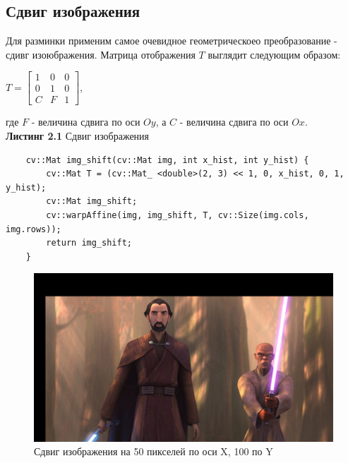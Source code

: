     \subsection{Сдвиг изображения}
    \noindent Для разминки применим самое очевидное геометрическоео преобразование - сдивг изоюбражения.
    Матрица отображения $T$ выглядит следующим образом:
    \begin{center}
        $
        T = 
        \begin{bmatrix}
            1 & 0 & 0\\
            0 & 1 & 0\\
            C & F & 1 
        \end{bmatrix}
        $,
    \end{center}
    где $F$ - величина сдвига по оси $Oy$, а $C$ - величина сдвига по оси $Ox$.
    \\
    \noindent \textbf{Листинг 2.1} Сдвиг изображения
    \begin{lstlisting}
    cv::Mat img_shift(cv::Mat img, int x_hist, int y_hist) {
        cv::Mat T = (cv::Mat_ <double>(2, 3) << 1, 0, x_hist, 0, 1, y_hist);
        cv::Mat img_shift;
        cv::warpAffine(img, img_shift, T, cv::Size(img.cols, img.rows));
        return img_shift;
    }
    \end{lstlisting}  
    \begin{figure}[h]
        \centering
        \includegraphics[scale=0.3]{"../images/results/shift_img.jpg"}
        \caption{Сдвиг изображения на 50 пикселей по оси X, 100 по Y}
    \end{figure}
    \newpage
